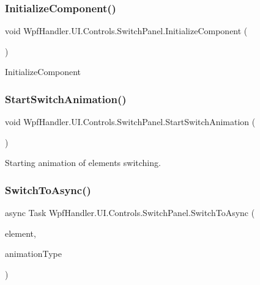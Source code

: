 \subsubsection{\texorpdfstring{Initialize\+Component()}{InitializeComponent()}\hspace{0.1cm}{\footnotesize\ttfamily [4/4]}}
{\footnotesize\ttfamily void Wpf\+Handler.\+U\+I.\+Controls.\+Switch\+Panel.\+Initialize\+Component (\begin{DoxyParamCaption}{ }\end{DoxyParamCaption})}



Initialize\+Component 

\mbox{\label{class_wpf_handler_1_1_u_i_1_1_controls_1_1_switch_panel_a2227b95066799ff4d9b0431c97513643}} 
\subsubsection{\texorpdfstring{Start\+Switch\+Animation()}{StartSwitchAnimation()}}
{\footnotesize\ttfamily void Wpf\+Handler.\+U\+I.\+Controls.\+Switch\+Panel.\+Start\+Switch\+Animation (\begin{DoxyParamCaption}{ }\end{DoxyParamCaption})\hspace{0.3cm}{\ttfamily [protected]}}



Starting animation of elements switching. 

\mbox{\label{class_wpf_handler_1_1_u_i_1_1_controls_1_1_switch_panel_a1797a0bb1de37134c2ed133718cdcee4}} 
\subsubsection{\texorpdfstring{Switch\+To\+Async()}{SwitchToAsync()}}
{\footnotesize\ttfamily async Task Wpf\+Handler.\+U\+I.\+Controls.\+Switch\+Panel.\+Switch\+To\+Async (\begin{DoxyParamCaption}\item[{U\+I\+Element}]{element,  }\item[{\mbox{\hyperlink{class_wpf_handler_1_1_u_i_1_1_controls_1_1_switch_panel_aad6e1d850ec0101cc8d98c259971e272}{Animation\+Type}}}]{animation\+Type }\end{DoxyParamCaption})}



